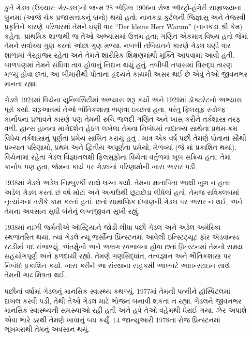 \documentclass[../../../include/open-logic-section]{subfiles}
\begin{document}



કુર્ત ગેડલ (ઉચ્ચાર: ગેર-ડલ)નો જન્મ 28 એપ્રિલ
1906ના રોજ ઑસ્ટ્રો-હંગેરી સામ્રાજ્યના બ્રુનમાં
(આજે ચેક પ્રજાસત્તાકનું બ્રનો) થયો હતો. નાનકડા
કુર્ટલની જિજ્ઞાસુ અને તેજસ્વી પ્રકૃતિને કારણે
પરિવારમાં તેમને ઘણી વાર “Der kleine Herr Warum”
(નાનકડા શ્રી કેમ) કહેતા. પ્રાથમિક શાળાથી જ
તેઓ અભ્યાસમાં ઉત્તમ હતા; ગણિત એકમાત્ર વિષય
હતો જેમાં તેમને સર્વોચ્ચ ગુણ કરતાં ઓછા ગુણ
મળ્યા. નબળી તબિયતને કારણે ગેડલ ઘણી વાર
શાળામાં ગેરહાજર રહેતા અને તેમને શારીરિક
શિક્ષણમાંથી મુક્તિ આપવામાં આવી હતી. બાળપણમાં
તેમને સંધિવા તાવ હોવાનું નિદાન થયું હતું.
તબીબી તપાસમાં વિરુદ્ધ તારણ મળ્યું હોવા
છતાં, આ બીમારીથી પોતાના હૃદયને કાયમી
અસર થઈ છે એવું તેઓ જીવનભર માનતા રહ્યા.

ગેડલે 1924માં વિયેના યુનિવર્સિટીમાં અભ્યાસ
શરૂ કર્યો અને 1929માં ડૉક્ટરેટનો અભ્યાસ
પૂરો કર્યો. શરૂઆતમાં તેઓ ભૌતિકશાસ્ત્ર
ભણવા ઇચ્છતા હતા, પરંતુ ફિલસૂફ રુડોલ્ફ
કાર્નાપના પ્રભાવને કારણે પણ તેમની રુચિ
જલદી ગણિત અને ખાસ કરીને તર્કશાસ્ત્ર તરફ
વળી. હાન્સ હાનના માર્ગદર્શન હેઠળ લખેલા
તેમના નિબંધમાં તાદાત્મ્ય સાથેના પ્રથમ-ક્રમ
વિધેય તર્કશાસ્ત્રનું પૂર્ણતા પ્રમેય સાબિત
કરાયું હતું \citep{Godel1929}. માત્ર એક
વર્ષ પછી તેમણે પોતાનાં સૌથી પ્રખ્યાત
પરિણામો, પ્રથમ અને દ્વિતીય અપૂર્ણતા
પ્રમેયો, મેળવ્યાં (જે
\citealt{Godel1931}માં પ્રકાશિત થયાં).
વિયેનામાં રહેતાં ગેડલ વિજ્ઞાનલક્ષી
ફિલસૂફોના વિયેના વર્તુળમાં ખૂબ સક્રિય
હતા. તેમાં કાર્નાપ પણ હતા, જેમના
કાર્ય પર ગેડલનાં પરિણામોની ખાસ અસર પડી.

1938માં ગેડલે અડેલ નિમ્બુર્સ્કી સાથે
લગ્ન કર્યાં. તેમના માતાપિતા આથી ખુશ
ન હતા: અડેલ ગેડલ કરતાં છ વર્ષ મોટાં
અને અગાઉથી છૂટાછેડા લીધેલાં હતાં,
તેમજ રાત્રિક્લબમાં નૃત્યાંગના તરીકે
કામ કરતાં હતાં. છતાં સામાજિક દબાણની
ગેડલ પર અસર ન થઈ, અને તેમના
અવસાન સુધી બંનેનું લગ્નજીવન સુખી રહ્યું.

1938માં નાઝી જર્મનીએ ઑસ્ટ્રિયાને
જોડી લીધા પછી ગેડલ અને અડેલ
અમેરિકા સ્થળાંતરિત થયાં. ત્યાં ગેડલે
ન્યૂ જર્સીના પ્રિન્સ્ટનમાં આવેલી
ઇન્સ્ટિટ્યૂટ ફૉર ઍડવાન્સ્ડ સ્ટડીમાં
પદ સંભાળ્યું. અંતર્મુખી અને
અલગ સ્વભાવના હોવા છતાં પ્રિન્સ્ટનમાં
તેમનો સમય સહયોગપૂર્ણ અને ફળદાયી રહ્યો.
તેમણે ગણસિદ્ધાંત, તત્વજ્ઞાન અને
ભૌતિકશાસ્ત્ર પર નિબંધો પ્રકાશિત કર્યા.
ખાસ કરીને આ સંસ્થાના સહકર્મી
આલ્બર્ટ આઇન્સ્ટાઇન સાથે તેમની
ગાઢ મિત્રતા થઈ.

પછીનાં વર્ષોમાં ગેડલનું માનસિક સ્વાસ્થ્ય
કથળ્યું. 1977માં તેમની પત્નીને
હૉસ્પિટલમાં દાખલ કરવી પડી, તેથી
તેઓ ગેડલ માટે ભોજન બનાવી શકતાં
ન રહ્યાં.
ગેડલને જીવનભર માનસિક સ્વાસ્થ્યની
સમસ્યાઓ રહી હતી અને હવે તેઓ
વહેમથી ઘેરાઈ ગયા. ઝેર અપાશે
એવા ભારે ડરથી તેમણે ખાવાનું
બંધ કર્યું. 14 જાન્યુઆરી 1978ના
રોજ પ્રિન્સ્ટનમાં ભૂખમરાથી
તેમનું અવસાન થયું.
\end{document}
